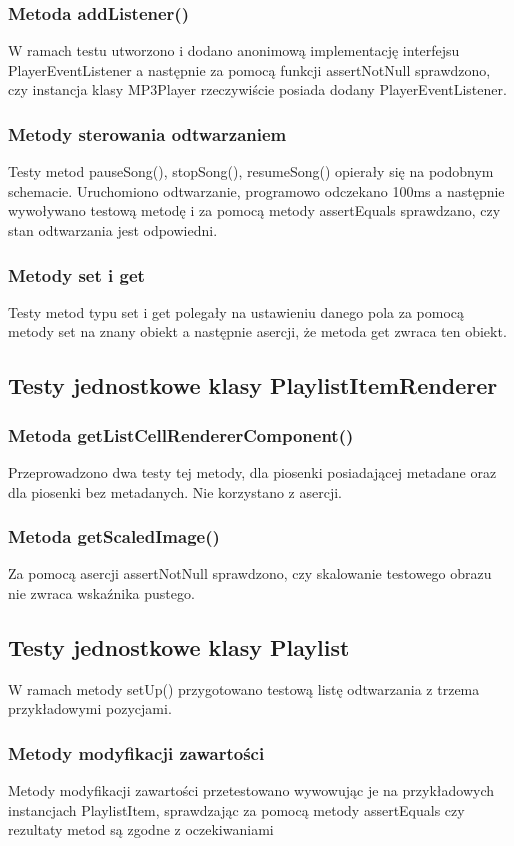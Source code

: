 \documentclass[12pt,a4paper,notitlepage]{article}
\begin{document}
\subsubsection{Metoda addListener()}
W ramach testu utworzono i dodano anonimową implementację interfejsu PlayerEventListener a następnie za pomocą funkcji assertNotNull sprawdzono, czy instancja klasy MP3Player rzeczywiście posiada
dodany PlayerEventListener.
\subsubsection{Metody sterowania odtwarzaniem}
Testy metod pauseSong(), stopSong(), resumeSong() opierały się na podobnym schemacie. Uruchomiono odtwarzanie, programowo odczekano 100ms a następnie wywoływano testową metodę i za pomocą 
metody assertEquals sprawdzano, czy stan odtwarzania jest odpowiedni.
\subsubsection{Metody set i get}
Testy metod typu set i get polegały na ustawieniu danego pola za pomocą metody set na znany obiekt a następnie asercji, że metoda get zwraca ten obiekt.

\subsection{Testy jednostkowe klasy PlaylistItemRenderer}
\subsubsection{Metoda getListCellRendererComponent()}
Przeprowadzono dwa testy tej metody, dla piosenki posiadającej metadane oraz dla piosenki bez metadanych. Nie korzystano z asercji.
\subsubsection{Metoda getScaledImage()}
Za pomocą asercji assertNotNull sprawdzono, czy skalowanie testowego obrazu nie zwraca wskaźnika pustego.

\subsection{Testy jednostkowe klasy Playlist}
W ramach metody setUp() przygotowano testową listę odtwarzania z trzema przykładowymi pozycjami.
\subsubsection{Metody modyfikacji zawartości}
Metody modyfikacji zawartości przetestowano wywowując je na przykładowych instancjach PlaylistItem, sprawdzając za pomocą metody assertEquals czy rezultaty metod są zgodne z oczekiwaniami
\end{document}
